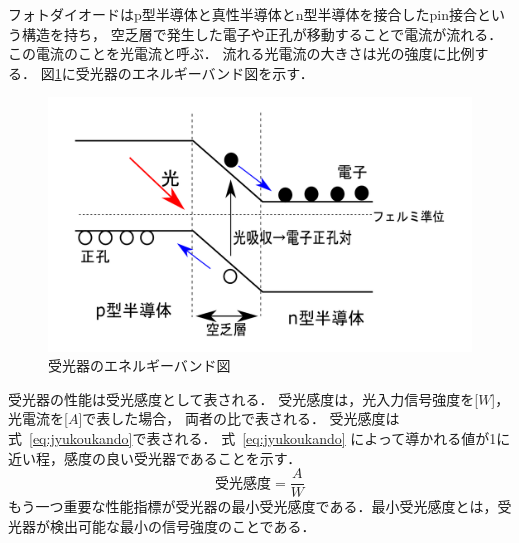 フォトダイオードはp型半導体と真性半導体とn型半導体を接合したpin接合という構造を持ち，
空乏層で発生した電子や正孔が移動することで電流が流れる．
この電流のことを光電流と呼ぶ．
流れる光電流の大きさは光の強度に比例する．
図\ref{fig:photo}に受光器のエネルギーバンド図を示す．
\begin{figure}[t!]
\begin{center}
\includegraphics[keepaspectratio,scale=0.4]{fig/3/photodiode.pdf}
\caption{受光器のエネルギーバンド図}
\label{fig:photo}
\end{center}
\end{figure}

受光器の性能は受光感度として表される．
受光感度は，光入力信号強度を[$W$]，光電流を[$A$]で表した場合，
両者の比で表される．
受光感度は式~\eqref{eq:jyukoukando}で表される．
式~\eqref{eq:jyukoukando} によって導かれる値が1に近い程，感度の良い受光器であることを示す．
\begin{equation}
受光感度 = \frac{A}{W}
\label{eq:jyukoukando}
\end{equation}
もう一つ重要な性能指標が受光器の最小受光感度である．最小受光感度とは，受光器が検出可能な最小の信号強度のことである．

